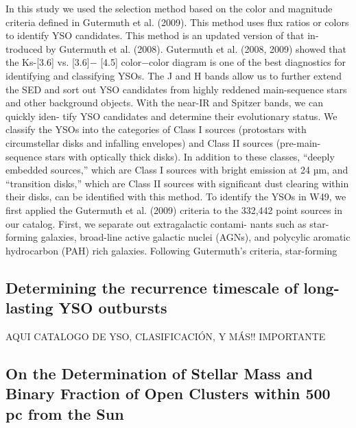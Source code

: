 \documentclass[../Main.tex]{subfiles}
\begin{document}
{In this study we used the selection method based on
the color and magnitude criteria defined in Gutermuth et al.
(2009). This method uses flux ratios or colors to identify
YSO candidates. This method is an updated version of that in-
troduced by Gutermuth et al. (2008). Gutermuth et al. (2008,
2009) showed that the Ks-[3.6] vs. [3.6]− [4.5] color−color
diagram is one of the best diagnostics for identifying and
classifying YSOs. The J and H bands allow us to further
extend the SED and sort out YSO candidates from highly
reddened main-sequence stars and other background objects.
With the near-IR and Spitzer bands, we can quickly iden-
tify YSO candidates and determine their evolutionary status.
We classify the YSOs into the categories of Class I sources
(protostars with circumstellar disks and infalling envelopes)
and Class II sources (pre-main-sequence stars with optically
thick disks). In addition to these classes, “deeply embedded
sources,” which are Class I sources with bright emission at
24 µm, and “transition disks,” which are Class II sources with
significant dust clearing within their disks, can be identified
with this method.
To identify the YSOs in W49, we first applied the
Gutermuth et al. (2009) criteria to the 332,442 point sources
in our catalog. First, we separate out extragalactic contami-
nants such as star-forming galaxies, broad-line active galactic
nuclei (AGNs), and polycylic aromatic hydrocarbon (PAH)
rich galaxies. Following Gutermuth’s criteria, star-forming

\subsection{Determining the recurrence timescale of long-lasting YSO
outbursts}


AQUI CATALOGO DE YSO, CLASIFICACIÓN, Y MÁS!! IMPORTANTE

\subsection{On the Determination of Stellar Mass and Binary Fraction of Open Clusters within
500 pc from the Sun}


}
\end{document}
